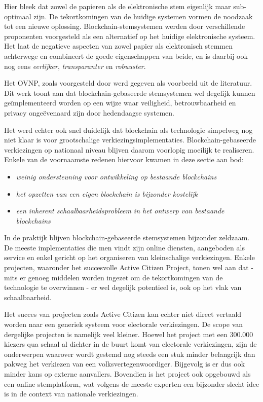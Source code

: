 	Hier bleek dat zowel de papieren als de elektronische stem eigenlijk maar sub-optimaal zijn. De tekortkomingen van de huidige systemen vormen de noodzaak tot een nieuwe oplossing. Blockchain-stemsystemen werden door verschillende proponenten voorgesteld als een alternatief op het huidige elektronische systeem. Het laat de negatieve aspecten van zowel papier als elektronisch stemmen achterwege en combineert de goede eigenschappen van beide,  en is daarbij ook nog eens \textit{eerlijker}, \textit{transparanter} en \textit{robuuster}.
	
	Het OVNP, zoals voorgesteld door \textcite{McCorry2017} werd gegeven als voorbeeld uit de literatuur. Dit werk toont aan dat blockchain-gebaseerde stemsystemen wel degelijk kunnen geïmplementeerd worden op een wijze waar veiligheid, betrouwbaarheid en privacy ongeëvenaard zijn door hedendaagse systemen.
	
	Het werd echter ook snel duidelijk dat blockchain als technologie simpelweg nog niet klaar is voor grootschalige verkiezingsimplementaties. Blockchain-gebaseerde verkiezingen op nationaal niveau blijven daarom voorlopig moeilijk te realiseren.  Enkele van de voornaamste redenen hiervoor kwamen in deze sectie aan bod:
	\begin{itemize}
		\item\textit{weinig ondersteuning voor ontwikkeling op bestaande blockchains}
		\item\textit{het opzetten van een eigen blockchain is bijzonder kostelijk}
		\item\textit{een inherent schaalbaarheidsprobleem in het ontwerp van bestaande blockchains}
	\end{itemize}
	In de praktijk blijven blockchain-gebaseerde stemsystemen bijzonder zeldzaam. De meeste implementaties die men vindt zijn online diensten, aangeboden als service en enkel gericht op het organiseren van kleinschalige verkiezingen. Enkele projecten, waaronder het succesvolle Active Citizen Project, tonen wel aan dat - mits er  genoeg middelen worden ingezet om de tekortkomingen van de technologie te overwinnen - er wel degelijk potentieel is, ook op het vlak van schaalbaarheid.
	
	Het succes van projecten zoals Active Citizen kan echter niet direct vertaald worden naar een generiek systeem voor electorale verkiezingen. De scope van dergelijke projecten is namelijk veel kleiner. Hoewel het project met een 300.000 kiezers qua schaal al dichter in de buurt komt van electorale verkiezingen, zijn de onderwerpen waarover wordt gestemd nog steeds een stuk minder belangrijk dan pakweg het verkiezen van een volksvertegenwoordiger. Bijgevolg is er dus ook minder kans op externe aanvallers. Bovendien is het project ook opgebouwd als een online stemplatform, wat volgens de meeste experten een bijzonder slecht idee is in de context van nationale verkiezingen.
	
